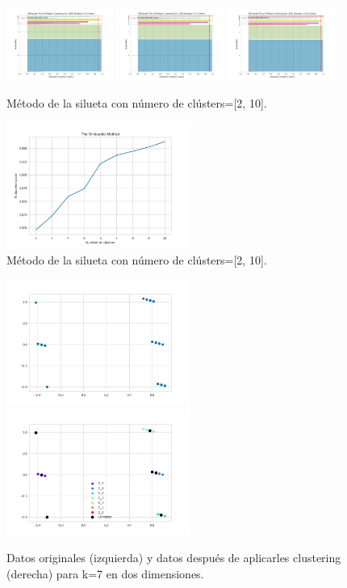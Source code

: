 \documentclass[10pt, a4paper]{article}
\begin{document}
\begin{figure}[hbt!]
    		\includegraphics[width = 3.5cm]{silhouette_visualization_8.png}
    		\includegraphics[width = 3.5cm]{silhouette_visualization_9.png}
    		\includegraphics[width = 3.5cm]{silhouette_visualization_10.png}
    		
    		\caption{M\'etodo de la silueta con n\'umero de cl\'usters=[2, 10].}
    	\end{figure}
    	
    	\begin{figure}[hbt!]
    		\centering
    		\includegraphics[width = 6cm]{SilhouetteM.png}
    		\caption{M\'etodo de la silueta con n\'umero de cl\'usters=[2, 10].}
    	\end{figure}
    	
    	\begin{figure}[hbt!]
    		\centering
    		\includegraphics[width = 6cm]{Original_Data_2d.png}
    		\includegraphics[width = 6cm]{Clustered_Data_2d_k7_seed45.png}
    		\caption{Datos originales (izquierda) y datos despu\'es de aplicarles clustering (derecha) para k=7 en dos dimensiones.}
    	\end{figure}
    	
\end{document}
